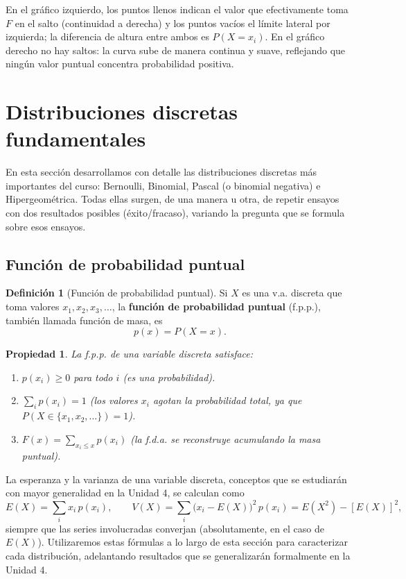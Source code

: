 \documentclass[11pt,a4paper]{article}
\theoremstyle{plain}
\newtheorem{propiedad}[teorema]{Propiedad}
\theoremstyle{definition}
\newtheorem{definicion}[teorema]{Definición}
\theoremstyle{remark}
\begin{document}
En el gráfico izquierdo, los puntos llenos indican el valor que efectivamente toma $F$ en el salto (continuidad a derecha) y los puntos vacíos el límite lateral por izquierda; la diferencia de altura entre ambos es $P(X=x_i)$. En el gráfico derecho no hay saltos: la curva sube de manera continua y suave, reflejando que ningún valor puntual concentra probabilidad positiva.

\newpage
\section{Distribuciones discretas fundamentales}

En esta sección desarrollamos con detalle las distribuciones discretas más importantes del curso: Bernoulli, Binomial, Pascal (o binomial negativa) e Hipergeométrica. Todas ellas surgen, de una manera u otra, de repetir ensayos con dos resultados posibles (éxito/fracaso), variando la pregunta que se formula sobre esos ensayos.

\subsection{Función de probabilidad puntual}

\begin{definicion}[Función de probabilidad puntual]
Si $X$ es una v.a. discreta que toma valores $x_1,x_2,x_3,\dots$, la \textbf{función de probabilidad puntual} (f.p.p.), también llamada función de masa, es
$$p(x)=P(X=x).$$
\end{definicion}

\begin{propiedad}
La f.p.p. de una variable discreta satisface:
\begin{enumerate}[label=(\roman*)]
\item $p(x_i)\ge0$ para todo $i$ (es una probabilidad).
\item $\displaystyle\sum_i p(x_i)=1$ (los valores $x_i$ agotan la probabilidad total, ya que $P(X\in\{x_1,x_2,\dots\})=1$).
\item $\displaystyle F(x)=\sum_{x_i\le x}p(x_i)$ (la f.d.a. se reconstruye acumulando la masa puntual).
\end{enumerate}
\end{propiedad}

La esperanza y la varianza de una variable discreta, conceptos que se estudiarán con mayor generalidad en la Unidad 4, se calculan como
$$E(X)=\sum_i x_i\,p(x_i), \qquad V(X)=\sum_i\big(x_i-E(X)\big)^2\,p(x_i)=E(X^2)-[E(X)]^2,$$
siempre que las series involucradas converjan (absolutamente, en el caso de $E(X)$). Utilizaremos estas fórmulas a lo largo de esta sección para caracterizar cada distribución, adelantando resultados que se generalizarán formalmente en la Unidad 4.
\end{document}

